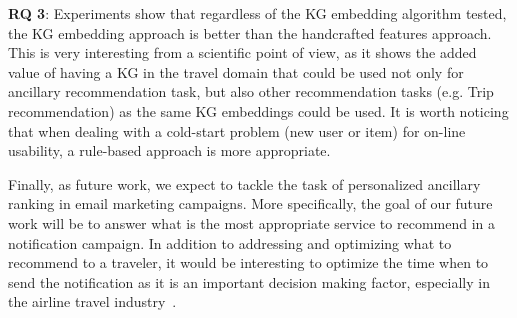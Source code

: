 \documentclass[11pt,dvipdfm]{article}
\begin{document}
\textbf{RQ 3}: Experiments show that regardless of the KG embedding algorithm tested, the KG embedding approach is better than the handcrafted features approach. This is very interesting from a scientific point of view, as it shows the added value of having a KG in the travel domain that could be used not only for ancillary recommendation task, but also other recommendation tasks (e.g. Trip recommendation) as the same KG embeddings could be used. It is worth noticing that when dealing with a cold-start problem (new user or item) for on-line usability, a rule-based approach is more appropriate.

Finally, as future work, we expect to tackle the task of personalized ancillary ranking in email marketing campaigns. More specifically, the goal of our future work will be to answer what is the most appropriate service to recommend in a notification campaign. In addition to addressing and optimizing what to recommend to a traveler, it would be interesting to optimize the time when to send the notification as it is an important decision making factor, especially in the airline travel industry~\cite{Dadoun21}.
\end{document}
